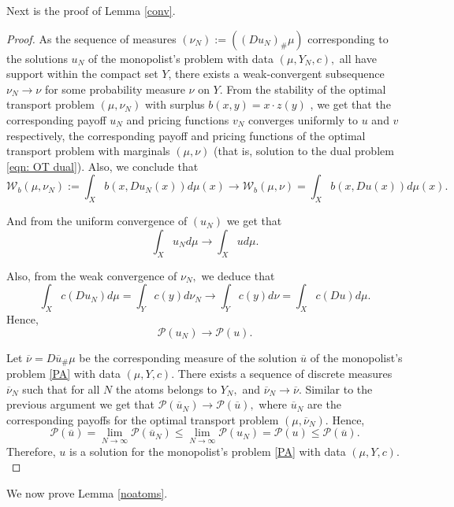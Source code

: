 \documentclass[12pt,reqno]{amsart}
\begin{document}
Next is the proof of Lemma \ref{conv}.
\begin{proof}
As the sequence of measures $(\nu_N) :=((Du_N)_\#\mu)$ corresponding to the solutions $u_N$ of the monopolist's problem with data $(\mu, Y_N,c),$ all have support within the compact set $Y$, there exists a weak-convergent subsequence $\nu_N\to\nu$ for some probability measure $\nu$ on $Y$.
From the stability of the optimal transport problem  $(\mu,\nu_N)$ with surplus $b(x,y)=x\cdot z(y)$ \cite{Santambrogio}, we get that the corresponding payoff $u_N$ and pricing functions $v_N$ converges uniformly to $u$ and $v$ respectively, the corresponding payoff and pricing functions of the optimal transport problem with marginals $(\mu, \nu)$ (that is, solution to the dual problem \eqref{eqn: OT dual}). Also, we conclude that
\[\mathcal{W}_b(\mu,\nu_N):=\int_X b(x,Du_N(x))d\mu(x)\to \mathcal{W}_b(\mu,\nu)=\int_X b(x,Du(x))d\mu(x).\]

And from the uniform convergence of $(u_N)$ we get that
\[\int_X u_Nd\mu\to\int_X u d\mu.\]

Also, from the weak convergence of $\nu_N,$ we deduce that
\[\int_X c(Du_N)d\mu=\int_Yc(y)d\nu_N\to \int_Y c(y)d\nu=\int_X c(Du)d\mu.\]
Hence,
\[\mathcal{P}(u_N)\to\mathcal{P}(u).\]

Let $\overline{\nu}=D\overline u_\#\mu$ be the corresponding measure of the solution $\overline{u}$ of the monopolist's problem \eqref{PA} with data $(\mu,Y,c).$ There exists a sequence of discrete measures $\overline{\nu}_N$ such that for all $N$ the atoms belongs to $Y_N,$ and $\overline{\nu}_N\to\overline{\nu}.$ Similar to the previous argument we get that $\mathcal{P}(\overline{u}_N)\to\mathcal{P}(\overline{u}),$ where $\overline{u}_N$ are the corresponding payoffs for the optimal transport problem $(\mu,\overline{\nu}_N).$ Hence, \[\mathcal{P}(\overline{u})=\lim_{N\to\infty}\mathcal{P}(\overline{u}_N)\le\lim_{N\to\infty}\mathcal{P}(u_N)=\mathcal{P}(u)\le\mathcal{P}(\overline{u}).\]
Therefore, $u$ is a solution for the monopolist's problem \eqref{PA} with data $(\mu,Y,c).$
\end{proof}
We now prove Lemma \ref{noatoms}.
\end{document}
